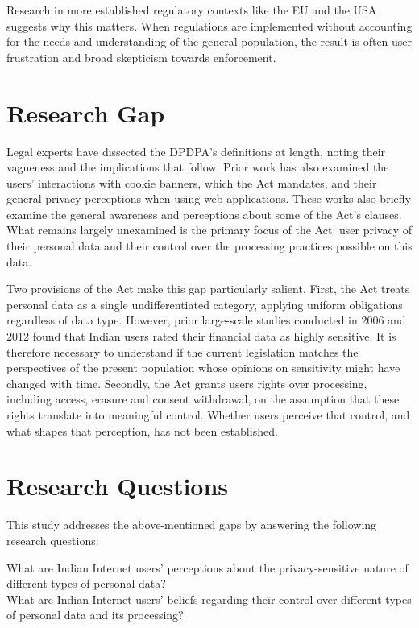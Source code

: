 Research in more established regulatory contexts like the EU and the USA suggests why this matters. When regulations are implemented without accounting for the needs and understanding of the general population, the result is often user frustration and broad skepticism towards enforcement.

\section{Research Gap}

Legal experts have dissected the DPDPA's definitions at length, noting their vagueness and the implications that follow. Prior work has also examined the users' interactions with cookie banners, which the Act mandates, and their general privacy perceptions when using web applications. These works also briefly examine the general awareness and perceptions about some of the Act's clauses. What remains largely unexamined is the primary focus of the Act: user privacy of their personal data and their control over the processing practices possible on this data. 

Two provisions of the Act make this gap particularly salient. First, the Act treats personal data as a single undifferentiated category, applying uniform obligations regardless of data type. However, prior large-scale studies conducted in 2006 and 2012 found that Indian users rated their financial data as highly sensitive. It is therefore necessary to understand if the current legislation matches the perspectives of the present population whose opinions on sensitivity might have changed with time. Secondly, the Act grants users rights over processing, including access, erasure and consent withdrawal, on the assumption that these rights translate into meaningful control. Whether users perceive that control, and what shapes that perception, has not been established. 

\section{Research Questions}
This study addresses the above-mentioned gaps by answering the following research questions:

    \RQ What are Indian Internet users’ perceptions about the privacy-sensitive nature of different types of personal data? \label{rq:1} \\
    \RQ What are Indian Internet users' beliefs regarding their control over different types of personal data and its processing? \label{rq:2}

